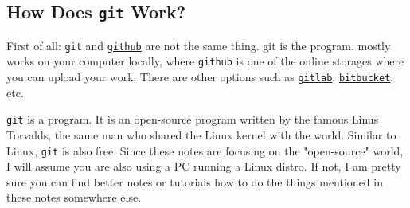 \documentclass{article}
\begin{document}
    \subsection{How Does \texttt{git} Work?}
        First of all: \texttt{git} and \href{https://github.com/}{\texttt{github}} are not the same thing. git is the program. mostly works on your computer locally, where \texttt{github} is one of the online storages where you can upload your work. There are other options such as \href{https://about.gitlab.com/}{\texttt{gitlab}}, \href{https://bitbucket.org/}{\texttt{bitbucket}}, etc.

        \texttt{git} is a program. It is an open-source program written by the famous Linus Torvalds, the same man who shared the Linux kernel with the world. Similar to Linux, \texttt{git} is also free. Since these notes are focusing on the "open-source" world, I will assume you are also using a PC running a Linux distro. If not, I am pretty sure you can find better notes or tutorials how to do the things mentioned in these notes somewhere else.


        
\end{document}
